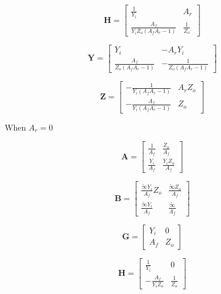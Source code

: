 \documentclass[a4paper, 12pt]{article}
\newcommand{\mat}[1]{\mathbf{#1}}
\begin{document}
\begin{equation}
\mat{H} = \left[\begin{matrix}\frac{1}{Y_{i}} & A_{r}\\\frac{A_{f}}{Y_{i} Z_{o} \left(A_{f} A_{r} - 1\right)} & \frac{1}{Z_{o}}\end{matrix}\right]
\end{equation}

\begin{equation}
\mat{Y} = \left[\begin{matrix}Y_{i} & - A_{r} Y_{i}\\\frac{A_{f}}{Z_{o} \left(A_{f} A_{r} - 1\right)} & - \frac{1}{Z_{o} \left(A_{f} A_{r} - 1\right)}\end{matrix}\right]
\end{equation}

\begin{equation}
\mat{Z} = \left[\begin{matrix}- \frac{1}{Y_{i} \left(A_{f} A_{r} - 1\right)} & A_{r} Z_{o}\\- \frac{A_{f}}{Y_{i} \left(A_{f} A_{r} - 1\right)} & Z_{o}\end{matrix}\right]
\end{equation}


When $A_r=0$

\begin{equation}
\mat{A} = \left[\begin{matrix}\frac{1}{A_{f}} & \frac{Z_{o}}{A_{f}}\\\frac{Y_{i}}{A_{f}} & \frac{Y_{i} Z_{o}}{A_{f}}\end{matrix}\right]
\end{equation}

\begin{equation}
\mat{B} = \left[\begin{matrix}\frac{\tilde{\infty} Y_{i}}{A_{f}} Z_{o} & \frac{\tilde{\infty} Z_{o}}{A_{f}}\\\frac{\tilde{\infty} Y_{i}}{A_{f}} & \frac{\tilde{\infty}}{A_{f}}\end{matrix}\right]
\end{equation}

\begin{equation}
\mat{G} = \left[\begin{matrix}Y_{i} & 0\\A_{f} & Z_{o}\end{matrix}\right]
\end{equation}

\begin{equation}
\mat{H} =\left[\begin{matrix}\frac{1}{Y_{i}} & 0\\- \frac{A_{f}}{Y_{i} Z_{o}} & \frac{1}{Z_{o}}\end{matrix}\right]
\end{equation}
\end{document}
